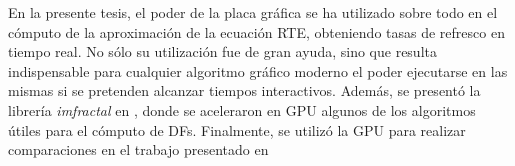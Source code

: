 En la presente tesis, el poder de la placa gráfica se ha utilizado sobre todo en el cómputo de la aproximación de la ecuación RTE, obteniendo tasas de refresco en tiempo real.
No sólo su utilización fue de gran ayuda, sino que resulta indispensable para cualquier algoritmo gráfico moderno el poder ejecutarse en las mismas si se pretenden alcanzar tiempos interactivos.
Además, se presentó la librería {\em imfractal} en \cite{Baravalle2013}, donde se aceleraron en GPU algunos de los algoritmos útiles para el cómputo de DFs.
Finalmente, se utilizó la GPU para realizar comparaciones en el trabajo presentado en \cite{Baravalle2014_2}

